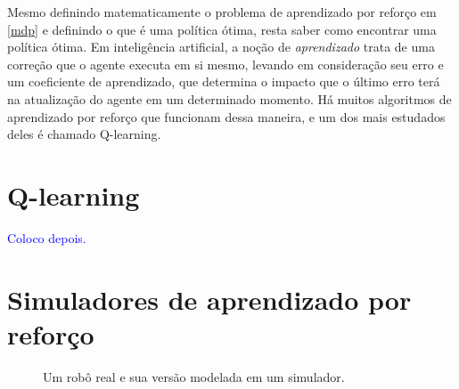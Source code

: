 \documentclass[cic,tc]{iiufrgs}
\newcommand\henrique[1]{\textcolor{blue}{#1}}
\begin{document}
Mesmo definindo matematicamente o problema de aprendizado por reforço em \ref{mdp} e definindo o que é uma política ótima, resta saber como encontrar uma
política ótima. Em inteligência artificial, a noção de \textit{aprendizado} trata de uma correção que o agente executa em si mesmo, levando em consideração
seu erro e um coeficiente de aprendizado, que determina o impacto que o último erro terá na atualização do agente em um determinado momento. Há muitos
algoritmos de aprendizado por reforço que funcionam dessa maneira, e um dos mais estudados deles é chamado Q-learning.

\section{Q-learning}
\henrique{Coloco depois.}
\blindtext


\section{Simuladores de aprendizado por reforço}
\begin{figure}[h]
    \caption{Um robô real e sua versão modelada em um simulador.}
    \begin{center}
    \end{center}
    \label{fig:mujocosimulator}
\end{figure}
\end{document}
